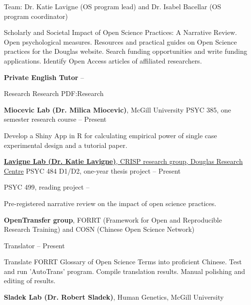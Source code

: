\documentclass[a4paper,12pt]{article}
\begin{document}
\begin{Body}
Team:
Dr. Katie Lavigne (OS program lead) and
Dr. Isabel Bacellar (OS program coordinator)
\begin{Detail}
\SubBulletItem
Scholarly and Societal Impact of Open Science Practices: A Narrative Review.
\SubBulletItem
Open psychological measures.
\SubBulletItem
Resources and practical guides on Open Science practices for the Douglas website.
\SubBulletItem
Search funding opportunities and write funding applications.
\SubBulletItem
Identify Open Access articles of affiliated researchers.
\end{Detail}

\BigGap
\Entry
\textbf{Private English Tutor}
\hfill
{} -- 

\Section
{Research}
{Research}
{PDF:Research}

{\textbf{Miocevic Lab (Dr. Milica Miocevic)}, McGill University}
\Gap
\BulletItem
PSYC 385, one semester research course
\hfill
{} -- Present
\begin{Detail}
Develop a Shiny App in R for calculating empirical power of single case experimental design and a tutorial paper.
\end{Detail}

\BigGap
\href{https://www.crispdouglas.ca}
{\textbf{Lavigne Lab (Dr. Katie Lavigne)}, CRISP research group, Douglas Research Centre}
\Gap
\BulletItem
PSYC 484 D1/D2, one-year thesis project 
\hfill
{} -- Present

\BulletItem
PSYC 499, reading project 
\hfill
{} -- 

\begin{Detail}
Pre-registered narrative review on the impact of open science practices.
\end{Detail}
\BigGap
\textbf{OpenTransfer group}, FORRT (Framework for Open and Reproducible Research Training) and COSN (Chinese Open Science Network)

Translator
\hfill
{} -- Present

\begin{Detail}
Translate FORRT Glossary of Open Science Terms into proficient Chinese. 
\SubBulletItem
Test and run 'AutoTrans' program.
\SubBulletItem
Compile translation results.
\SubBulletItem
Manual polishing and editing of results.
\end{Detail}

\BigGap
\textbf{Sladek Lab (Dr. Robert Sladek)}, Human Genetics, McGill University


\end{Body}
\end{document}
